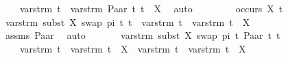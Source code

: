 \begin{isabellebody}
\ \ \ \ vars{\isacharunderscore}{\kern0pt}trm\ t{}\ {\isasymunion}\ vars{\isacharunderscore}{\kern0pt}trm\ {\isacharparenleft}{\kern0pt}Paar\ t{}{}\ t{}{}{\isacharparenright}{\kern0pt}\ {\isacharminus}{\kern0pt}\ {\isacharbraceleft}{\kern0pt}X{\isacharbraceright}{\kern0pt}{\isachardoublequoteclose}\ \isamarkupfalse%
\ auto\isanewline
\ \ \isamarkupfalse%
\isanewline
\ \ \ \ \isamarkupfalse%
\ {\isachardoublequoteopen}occurs\ X\ t{}{}{\isachardoublequoteclose}\isanewline
\ \ \ \ \ \isamarkupfalse%
\ {\isachardoublequoteopen}vars{\isacharunderscore}{\kern0pt}trm\ {\isacharparenleft}{\kern0pt}subst\ {\isacharbrackleft}{\kern0pt}{\isacharparenleft}{\kern0pt}X{\isacharcomma}{\kern0pt}\ swap\ pi\ t{}{\isacharparenright}{\kern0pt}{\isacharbrackright}{\kern0pt}\ t{}{}{\isacharparenright}{\kern0pt}\ {\isacharequal}{\kern0pt}\ vars{\isacharunderscore}{\kern0pt}trm\ t{}\ {\isasymunion}\ vars{\isacharunderscore}{\kern0pt}trm\ t{}{}\ {\isacharminus}{\kern0pt}\ {\isacharbraceleft}{\kern0pt}X{\isacharbraceright}{\kern0pt}{\isachardoublequoteclose}\isanewline
\ \ \ \ \ \ \ \isamarkupfalse%
\ assms{\isacharparenleft}{\kern0pt}{}{\isacharparenright}{\kern0pt}\ Paar\ \isamarkupfalse%
\ auto\isanewline
\ \ \ \ \ \isamarkupfalse%
\ {\isachardoublequoteopen}vars{\isacharunderscore}{\kern0pt}trm\ {\isacharparenleft}{\kern0pt}subst\ {\isacharbrackleft}{\kern0pt}{\isacharparenleft}{\kern0pt}X{\isacharcomma}{\kern0pt}\ swap\ pi\ t{}{\isacharparenright}{\kern0pt}{\isacharbrackright}{\kern0pt}\ {\isacharparenleft}{\kern0pt}Paar\ t{}{}\ t{}{}{\isacharparenright}{\kern0pt}{\isacharparenright}{\kern0pt}\ {\isacharequal}{\kern0pt}\isanewline
\ \ \ \ {\isacharparenleft}{\kern0pt}vars{\isacharunderscore}{\kern0pt}trm\ t{}\ {\isasymunion}\ vars{\isacharunderscore}{\kern0pt}trm\ t{}{}\ {\isacharminus}{\kern0pt}\ {\isacharbraceleft}{\kern0pt}X{\isacharbraceright}{\kern0pt}{\isacharparenright}{\kern0pt}\ {\isasymunion}\ {\isacharparenleft}{\kern0pt}vars{\isacharunderscore}{\kern0pt}trm\ t{}\ {\isasymunion}\ vars{\isacharunderscore}{\kern0pt}trm\ t{}{}\ {\isacharminus}{\kern0pt}\ {\isacharbraceleft}{\kern0pt}X{\isacharbraceright}{\kern0pt}{\isacharparenright}{\kern0pt}{\isachardoublequoteclose}\isanewline

\end{isabellebody}
